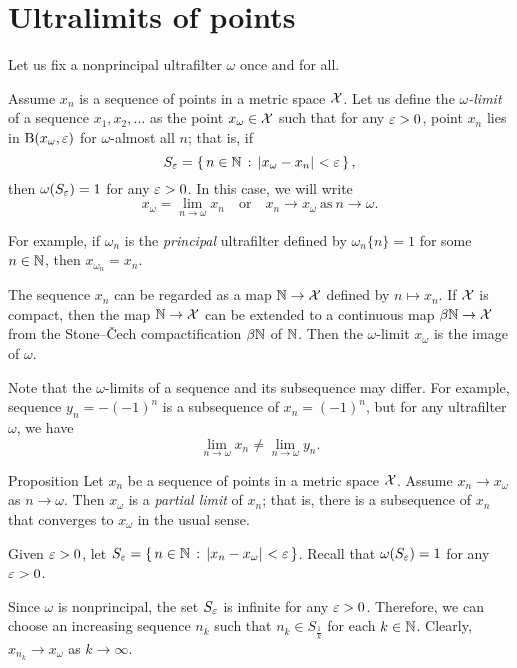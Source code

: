 \section{Ultralimits of points}
\label{ultralimits}

Let us fix a nonprincipal  ultrafilter $\omega$ once and for all.

Assume $x_n$ is a sequence of points in a metric space $\mathcal{X}$. 
Let us define the \emph{$\omega$-limit} of a sequence $x_1,x_2,\dots$ as the point $x_\omega\in\mathcal{X}$ 
such that for any $\varepsilon>0$, point $x_n$ lies in $\mathrm{B}{}(x_\omega,\varepsilon)$ for $\omega$-almost all $n$; 
that is, if 
\[S_\eps=\set{n\in\NN}{\dist{x_\omega}{x_n}{}<\eps},\]
then $\omega(S_\varepsilon)=1$ for any $\varepsilon>0$.
In this case, we will write 
\[x_\omega=\lim_{n\to\omega} x_n
\quad\text{or}\quad 
x_n\to x_\omega\ \text{as}\ n\to\omega.\]

For example, if $\omega_n$ is the \textit{principal} ultrafilter defined by $\omega_n\{n\}=1$ for some $n\in\mathbb{N}$, then
$x_{\omega_n}=x_n$.

The sequence $x_n$ can be regarded as a map $\mathbb{N}\to\mathcal{X}$ defined by $n\mapsto x_n$.
If $\mathcal{X}$ is compact, then the map $\mathbb{N}\to\mathcal{X}$ can be extended to a continuous map $\beta\mathbb{N}\to\mathcal{X}$ from the Stone--\v{C}ech compactification $\beta\mathbb{N}$ of $\mathbb{N}$.
Then the $\omega$-limit $x_\omega$ is the image of $\omega$.

Note that the $\omega$-limits of a sequence and its subsequence may differ.
For example, sequence $y_n=-(-1)^n$ is a subsequence of $x_n=(-1)^n$, but for any ultrafilter $\omega$, we have
\[\lim_{n\to\omega}x_n
\ne
\lim_{n\to\omega}y_n.\] 

\begin{thm}{Proposition}\label{prop:ultra/partial}
Let $x_n$ be a sequence of points in a metric space $\mathcal{X}$.
Assume $x_n\to x_\omega$ as $n\to\omega$.
Then $x_\omega$ is a \emph{partial limit} of $x_n$;
that is, there is a subsequence of $x_n$ that converges to $x_\omega$ in the usual sense.
\end{thm}

Given $\varepsilon>0$, 
let $S_\eps=\set{n\in\NN}{\dist{x_n}{x_\omega}{}<\eps}$.
Recall that $\omega(S_\varepsilon)=1$ for any $\varepsilon>0$.

Since $\omega$ is nonprincipal, the set $S_\varepsilon$ is infinite for any $\varepsilon>0$.
Therefore, we can choose an increasing sequence $n_k$
such that $n_k\in S_{\frac1k}$ for each $k\in \mathbb{N}$.
Clearly, $x_{n_k}\to x_\omega$ as $k\to\infty$.
\qeds

